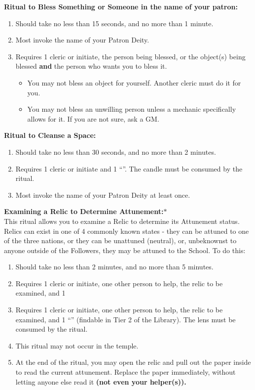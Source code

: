 \documentclass[green]{GL2020}
\begin{document}
\textbf{Ritual to Bless Something or Someone in the name of your patron:}
  \begin{enumerate}
    \item Should take no less than 15 seconds, and no more than 1 minute.
    \item Most invoke the name of your Patron Deity.
    \item Requires 1 cleric or initiate, the person being blessed, or the object(s) being blessed \textbf{and} the person who wants you to bless it. 
    \begin{itemize}
      \item You may not bless an object for yourself. Another cleric must do it for you.
      \item You may not bless an unwilling person unless a mechanic specifically allows for it. If you are not sure, ask a GM.
    \end{itemize}
  \end{enumerate}

\textbf{Ritual to Cleanse a Space:}
  \begin{enumerate}
    \item Should take no less than 30 seconds, and no more than 2 minutes.
    \item Requires 1 cleric or initiate and 1 ``\iRitualCandle{}''. The candle must be consumed by the ritual.
    \item Most invoke the name of your Patron Deity at least once.
  \end{enumerate}
   
\textbf{Examining a Relic to Determine Attunement:}$*$\\
This ritual allows you to examine a Relic to determine its Attunement status. Relics can exist in one of 4 commonly known states - they can be attuned to one of the three nations, or they can be unattuned (neutral), or, unbeknownst to anyone outside of the Followers, they may be attuned to the School. To do this:
  \begin{enumerate}
    \item Should take no less than 2 minutes, and no more than 5 minutes.
    \item Requires 1 cleric or initiate, one other person to help, the relic to be examined, and 1     \item Requires 1 cleric or initiate, one other person to help, the relic to be examined, and 1 ``\iCrystalLens{}'' (findable in Tier 2 of the Library). The lens must be consumed by the ritual. 
    \item This ritual may not occur in the temple.
    \item At the end of the ritual, you may open the relic and pull out the paper inside to read the current attunement. Replace the paper immediately, without letting anyone else read it \textbf{(not even your helper(s)).}
  \end{enumerate}
   
\end{document}

